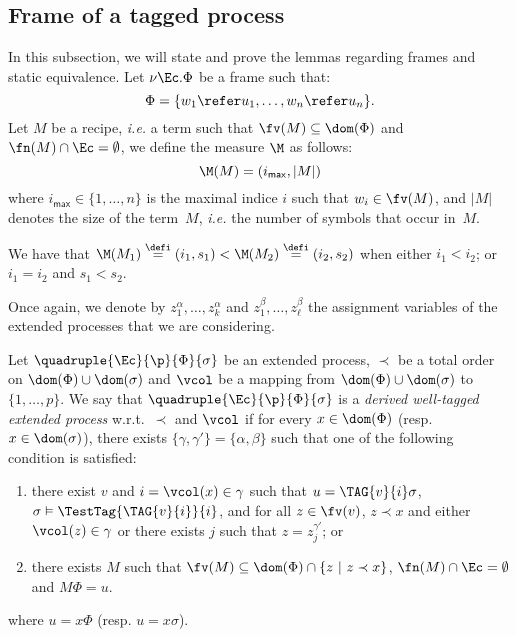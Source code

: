 \subsection{Frame of a tagged process}
\label{subset: frame flagged process}

In this subsection, we will state and prove the lemmas regarding
frames and static equivalence.
Let $\nu \Ec. \Phi$ be a frame such that:
\[
\Phi = \{ w_1
\refer u_1, \ldots, w_n \refer u_n\}.
\]
Let $M$ be a recipe, \emph{i.e.} a term such that $\fv(M) \subseteq \dom(\Phi)$ and $\fn(M) \cap
\Ec = \emptyset$, we define the measure $\M$ as follows:
 \[
\M(M) = (i_\mathsf{max}, |M|)
\]
where $i_\mathsf{max} \in \{1,\ldots,n\}$ is the maximal indice $i$ such that
$w_ i \in \fv(M)$, and $|M|$ denotes the size of the term~$M$, \emph{i.e.} the number of
symbols that occur in~$M$.

We have that $\M(M_1) \stackrel{\defi}{=} (i_1, s_1) < \M(M_2)
\stackrel{\defi}{=} (i_2,s_2)$ when
either $i_1 < i_2$;
or $i_1 = i_2$ and $s_1 < s_2$.

Once again, we denote by $z^\alpha_1, \ldots, z^\alpha_k$ and $z^\beta_1, \ldots, z^\beta_\ell$ the assignment variables of the extended processes that we are considering. 









\begin{definition}
 Let $\quadruple{\Ec}{\p}{\Phi}{\sigma}$ be an extended process, $\prec$ be a total order on $\dom(\Phi) \cup \dom(\sigma)$ and $\vcol$ be a mapping from $\dom(\Phi) \cup \dom(\sigma)$ to $\{ 1, \ldots, p\}$. We say that  $\quadruple{\Ec}{\p}{\Phi}{\sigma}$ is a \emph{derived well-tagged extended process} w.r.t.~$\prec$ and $\vcol$ if for every $x \in \dom(\Phi)$ (resp. $x \in \dom(\sigma)$), there exists $\{\gamma,\gamma'\} = \{\alpha,\beta\}$ such that one of the following condition is
satisfied:
\begin{enumerate}
\item there exist $v$ and $i = \vcol(x) \in \gamma$ such that
  $u = \TAG{v}{i}\sigma$, $\sigma  \vDash
  \TestTag{\TAG{v}{i}}{i}$, and for all $z \in \fv(v)$, $z \prec x$ and either $\vcol(z) \in \gamma$ or there exists $j$ such that $z = z^{\gamma'}_j$; or
\item there exists $M$ such that $\fv(M)
    \subseteq \dom(\Phi) \cap \{z ~|~ z \prec x\}$, $\fn(M) \cap \Ec = \emptyset$ and
    $M\Phi = u$.
\end{enumerate}
where $u = x\Phi$ (resp. $u = x\sigma$). 
\end{definition}

